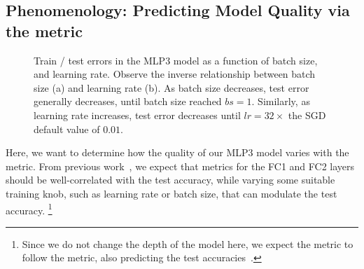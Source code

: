 
\subsection{\HTSR Phenomenology: Predicting Model Quality via the \ALPHA metric}
\label{sxn:empirical-test_acc}

\begin{figure}[t]
  \center
  \caption{Train / test errors in the MLP3 model as a function of batch size, and learning rate. Observe the inverse relationship between batch size (a) and learning rate (b). As batch size decreases, test error generally decreases, until batch size reached $bs=1$. Similarly, as learning rate increases, test error decreases until $lr=32\times$ the SGD default value of $0.01$.
  }
  \label{fig:mlp3-accuracies}
\end{figure}

Here, we want to determine how the quality of our MLP3 model varies with the \ALPHA metric. 
From previous work~\cite{MM20a_trends_NatComm,MM21a_simpsons_TR,YTHx22_TR}, we expect that \ALPHA metrics for the FC1 and FC2 layers should be well-correlated with the test accuracy, while varying some suitable training knob, such as learning rate or batch size, that can modulate the test accuracy.%
\footnote{Since we do not change the depth of the model here, we expect the \ALPHA metric to follow the \ALPHAHAT metric, also predicting the test accuracies~\cite{MM21a_simpsons_TR}.}

